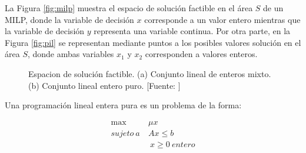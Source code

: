 La Figura \ref{fig:milp} muestra el espacio de solución factible en el área $S$ de un MILP, donde la variable de decisión $x$ corresponde a un valor entero mientras que la variable de decisión $y$ representa una variable continua. Por otra parte, en la Figura \ref{fig:pil} se representan mediante puntos a los posibles valores solución en el área $S$, donde ambas variables $x_1$ y $x_2$ corresponden a valores enteros.

\begin{figure}[H]
   \captionsetup[figure]{labelformat=empty}
   \centering
   \caption{Espacion de solución factible. (a) Conjunto lineal de enteros mixto. (b) Conjunto lineal entero puro. [Fuente: \cite{Conforti2014IntegerProgramming}]}
   \label{fig:milp_ip}
\end{figure}

Una programación lineal entera pura es un problema de la forma:

\begin{equation} \label{programacion_entera}
\begin{aligned}
             \max\: & \mu x \\ 
        sujeto\:a\: & Ax \leq b \\
                    &\: x \geq 0\: entero
\end{aligned}
\end{equation}

